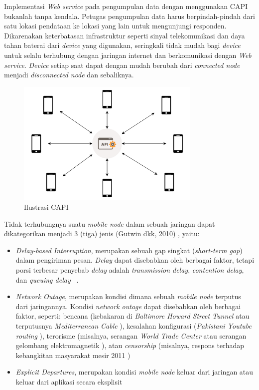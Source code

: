 Implementasi \textit{Web service} pada pengumpulan data dengan menggunakan CAPI bukanlah tanpa kendala. Petugas pengumpulan data harus berpindah-pindah dari satu lokasi pendataan ke lokasi yang lain untuk mengunjungi responden. Dikarenakan keterbatasan infrastruktur seperti sinyal telekomunikasi dan daya tahan baterai dari \textit{device} yang digunakan, seringkali tidak mudah bagi \textit{device} untuk selalu terhubung dengan jaringan internet dan berkomunikasi dengan \textit{Web service}. \textit{Device} setiap saat dapat dengan mudah berubah dari \textit{connected node} menjadi \textit{disconnected node} dan sebaliknya. 

\begin{figure}[h]
    \centering
    \includegraphics[height=6cm]{../../Resources/Images/capi-ilustration}
    \caption{Ilustrasi CAPI}
    \label{fig:capi-ilustration}
\end{figure}

Tidak terhubungnya suatu \textit{mobile node} dalam sebuah jaringan dapat dikategorikan menjadi 3 (tiga) jenis (Gutwin dkk, 2010) \cite{gutwin_gone_2010}, yaitu:
\begin{itemize}
\item \textit{Delay-based Interruption}, merupakan sebuah gap singkat (\textit{short-term gap}) dalam pengiriman pesan. \textit{Delay} dapat disebabkan oleh berbagai faktor, tetapi porsi terbesar penyebab \textit{delay} adalah \textit{transmission delay}, \textit{contention delay}, dan \textit{queuing delay} ~\cite{zhang_interference-based_2015}.
\item \textit{Network Outage}, merupakan kondisi dimana sebuah \textit{mobile node} terputus dari jaringannya. Kondisi \textit{network outage} dapat disebabkan oleh berbagai faktor, seperti: bencana (kebakaran di \textit{Baltimore Howard Street Tunnel \cite{mcgrattan_numerical_2006}} atau terputusnya \textit{Mediterranean Cable} \cite{zmijewski_mediterranean_2008}), kesalahan konfigurasi (\textit{Pakistani Youtube routing} \cite{hunter_pakistan_2008}), terorisme (misalnya, serangan \textit{World Trade Center} \cite{partridge_internet_2003} atau serangan gelombang elektromagnetik \cite{foster_jr_report_2004}), atau \textit{censorship} (misalnya, respons terhadap kebangkitan masyarakat mesir 2011 \cite{dainotti_analysis_2011})
\item \textit{Explicit Departures}, merupakan kondisi \textit{mobile node} keluar dari jaringan atau keluar dari aplikasi secara eksplisit
\end{itemize}


